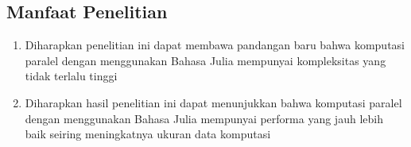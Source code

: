 \subsection{Manfaat Penelitian}
\begin{enumerate}
  \item Diharapkan penelitian ini dapat membawa pandangan baru bahwa komputasi paralel
    dengan menggunakan Bahasa Julia mempunyai kompleksitas yang tidak terlalu tinggi

  \item Diharapkan hasil penelitian ini dapat menunjukkan bahwa komputasi paralel
    dengan menggunakan Bahasa Julia mempunyai performa yang jauh lebih baik seiring
    meningkatnya ukuran data komputasi
\end{enumerate}